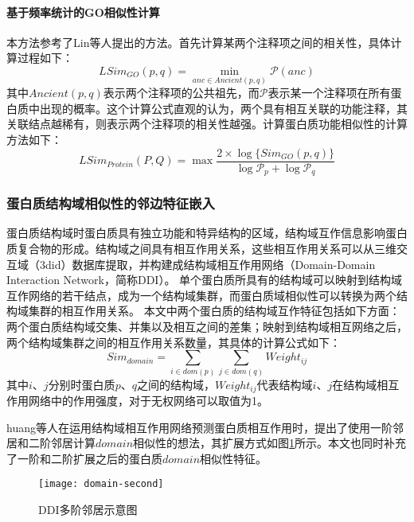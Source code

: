\paragraph*{基于频率统计的GO相似性计算}

本方法参考了Lin等人\cite{lin_information-theoretic_1998}提出的方法。首先计算某两个注释项之间的相关性，具体计算过程如下：
\begin{equation}
    \label{equ:feat:go:SimItemLin}
    LSim_{GO}(p,q)=\min_{anc \in Ancient(p,q)}\mathcal{P} (anc)
\end{equation}
其中$Ancient(p,q)$表示两个注释项的公共祖先，而$\mathcal{P}$表示某一个注释项在所有蛋白质中出现的概率。这个计算公式直观的认为，两个具有相互关联的功能注释，其关联结点越稀有，则表示两个注释项的相关性越强。计算蛋白质功能相似性的计算方法如下：
\begin{equation}
    \label{equ:feat:go:SimProteinLin}
    LSim_{Protein}(P,Q)=\max{\frac{2\times \log \{Sim_{GO}(p,q)\}}{\log {\mathcal{P}_p}+\log {\mathcal{P}_q}} }
\end{equation}

\subsubsection{蛋白质结构域相似性的邻边特征嵌入}

蛋白质结构域时蛋白质具有独立功能和特异结构的区域，结构域互作信息影响蛋白质复合物的形成\cite{kim_relating_2006}。结构域之间具有相互作用关系，这些相互作用关系可以从三维交互域（3did）数据库\cite{mosca_3did_2014}提取，并构建成结构域相互作用网络（Domain-Domain Interaction Network，简称DDI）。
单个蛋白质所具有的结构域可以映射到结构域互作网络的若干结点，成为一个结构域集群，而蛋白质域相似性可以转换为两个结构域集群的相互作用关系。
本文中两个蛋白质的结构域互作特征包括如下方面：两个蛋白质结构域交集、并集以及相互之间的差集；映射到结构域相互网络之后，两个结构域集群之间的相互作用关系数量，其具体的计算公式如下：
\begin{equation}
    \label{equ:feat:domain}
    Sim_{domain} = \sum_{i \in dom(p)}{\sum_{j \in dom(q)}{Weight_{ij}}}
\end{equation}
其中$i$、$j$分别时蛋白质$p$、$q$之间的结构域，$Weight_{ij}$代表结构域$i$、$j$在结构域相互作用网络中的作用强度，对于无权网络可以取值为1。

huang等人\cite{huang_protein-protein_2013}在运用结构域相互作用网络预测蛋白质相互作用时，提出了使用一阶邻居和二阶邻居计算$domain$相似性的想法，其扩展方式如图\ref{fig:domain-second}所示。本文也同时补充了一阶和二阶扩展之后的蛋白质$domain$相似性特征。
\begin{figure}[htbp]
    \centering
    \texttt{[image: domain-second]}
    \caption{DDI多阶邻居示意图}
    \label{fig:domain-second}
\end{figure}

